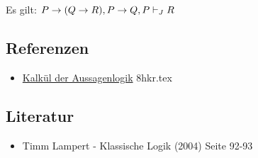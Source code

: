 \documentclass{sajzk}
\begin{document}
Es gilt: $P \rightarrow (Q\rightarrow R), P \rightarrow Q, P \vdash_J R$
\subsection{Referenzen}
\begin{itemize}
    \item \href{8hkr.pdf}{Kalkül der Aussagenlogik} 8hkr.tex
\end{itemize}

\subsection{Literatur}
\begin{itemize}
    \item Timm Lampert - Klassische Logik (2004) Seite 92-93
\end{itemize}
\end{document}
